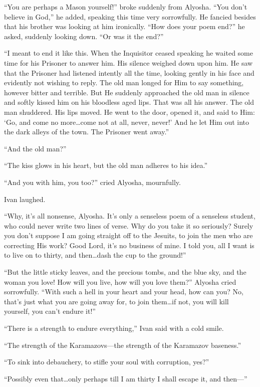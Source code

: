 ``You are perhaps a Mason yourself!'' broke suddenly from Alyosha.
``You don't believe in God,'' he added, speaking this time very
sorrowfully. He fancied besides that his brother was looking at him
ironically. ``How does your poem end?'' he asked, suddenly looking
down. ``Or was it the end?''

``I meant to end it like this. When the Inquisitor ceased speaking he
waited some time for his Prisoner to answer him. His silence weighed
down upon him. He saw that the Prisoner had listened intently all the
time, looking gently in his face and evidently not wishing to reply.
The old man longed for Him to say something, however bitter and
terrible. But He suddenly approached the old man in silence and softly
kissed him on his bloodless aged lips. That was all his answer. The
old man shuddered. His lips moved. He went to the door, opened it, and
said to Him: `Go, and come no more\ldots come not at all, never,
never!' And he let Him out into the dark alleys of the town. The
Prisoner went away.''

``And the old man?''

``The kiss glows in his heart, but the old man adheres to his idea.''

``And you with him, you too?'' cried Alyosha, mournfully.

Ivan laughed.

``Why, it's all nonsense, Alyosha. It's only a senseless poem of a
senseless student, who could never write two lines of verse. Why do
you take it so seriously? Surely you don't suppose I am going straight
off to the Jesuits, to join the men who are correcting His work? Good
Lord, it's no business of mine. I told you, all I want is to live on
to thirty, and then\ldots dash the cup to the ground!''

``But the little sticky leaves, and the precious tombs, and the blue
sky, and the woman you love! How will you live, how will you love
them?'' Alyosha cried sorrowfully. ``With such a hell in your heart
and your head, how can you? No, that's just what you are going away
for, to join them\ldots if not, you will kill yourself, you can't
endure it!''

``There is a strength to endure everything,'' Ivan said with a cold
smile.

``The strength of the Karamazovs---the strength of the Karamazov
baseness.''

``To sink into debauchery, to stifle your soul with
corruption, yes?''

``Possibly even that\ldots only perhaps till I am thirty I shall
escape it, and then---''

